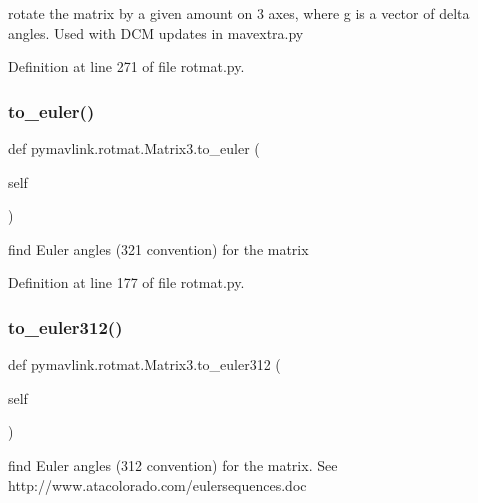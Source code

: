 \begin{DoxyVerb}rotate the matrix by a given amount on 3 axes,
where g is a vector of delta angles. Used
with DCM updates in mavextra.py\end{DoxyVerb}
 

Definition at line 271 of file rotmat.\+py.

\mbox{\label{classpymavlink_1_1rotmat_1_1Matrix3_a19396c2c390f18faf6701318dba6817a}} 
\subsubsection{\texorpdfstring{to\_euler()}{to\_euler()}}
{\footnotesize\ttfamily def pymavlink.\+rotmat.\+Matrix3.\+to\+\_\+euler (\begin{DoxyParamCaption}\item[{}]{self }\end{DoxyParamCaption})}

\begin{DoxyVerb}find Euler angles (321 convention) for the matrix\end{DoxyVerb}
 

Definition at line 177 of file rotmat.\+py.

\mbox{\label{classpymavlink_1_1rotmat_1_1Matrix3_a2c98ce17c4aea40f8de2ea1716000ea4}} 
\subsubsection{\texorpdfstring{to\_euler312()}{to\_euler312()}}
{\footnotesize\ttfamily def pymavlink.\+rotmat.\+Matrix3.\+to\+\_\+euler312 (\begin{DoxyParamCaption}\item[{}]{self }\end{DoxyParamCaption})}

\begin{DoxyVerb}find Euler angles (312 convention) for the matrix.
See http://www.atacolorado.com/eulersequences.doc
\end{DoxyVerb}
 


